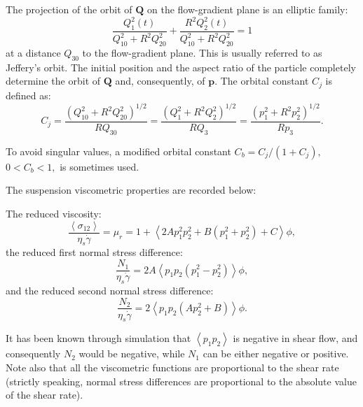 \documentclass[english,fleqn,allpages]{ISTE_science}[2018/07/30]
\begin{document}
The projection of the orbit of $\mathbf{Q}$ on the flow-gradient
plane is an elliptic family:
\begin{equation}
\frac{Q_{1}^{2}\left(t\right)}{Q_{10}^{2}+R^{2}Q_{20}^{2}}+\frac{R^{2}Q_{2}^{2}\left(t\right)}{Q_{10}^{2}+R^{2}Q_{20}^{2}}=1
\end{equation}
at a distance $Q_{30}$ to the flow-gradient plane. This is usually
referred to as Jeffery's orbit. The initial position and the aspect
ratio of the particle completely determine the orbit of $\mathbf{Q}$
and, consequently, of $\mathbf{p}.$ The orbital constant $C_{j}$
is defined as:
\begin{equation}
C_{j}=\frac{\left(Q_{10}^{2}+R^{2}Q_{20}^{2}\right)^{1/2}}{RQ_{30}}=\frac{\left(Q_{1}^{2}+R^{2}Q_{2}^{2}\right)^{1/2}}{RQ_{3}}=\frac{\left(p_{1}^{2}+R^{2}p_{2}^{2}\right)^{1/2}}{Rp_{3}}.
\end{equation}

To avoid singular values, a modified orbital constant $C_{b}=C_{j}/\left(1+C_{j}\right),$\break
$0<C_{b}<1,$ is sometimes used.


The suspension viscometric properties are recorded below:

The reduced viscosity: 
\begin{equation}
\frac{\left\langle \sigma_{12}\right\rangle }{\eta_{s}\dot{\gamma}}=\mu_{r}=1+\left\langle 2Ap_{1}^{2}p_{2}^{2}+B\left(p_{1}^{2}+p_{2}^{2}\right)+C\right\rangle \phi,
\end{equation}
the reduced first normal stress difference: 
\begin{equation}
\frac{N_{1}}{\eta_{s}\dot{\gamma}}=2A\left\langle p_{1}p_{2}\left(p_{1}^{2}-p_{2}^{2}\right)\right\rangle \phi,
\end{equation}
and the reduced second normal stress difference: 
\begin{equation}
\frac{N_{2}}{\eta_{s}\dot{\gamma}}=2\left\langle p_{1}p_{2}\left(Ap_{2}^{2}+B\right)\right\rangle \phi.
\end{equation}

It has been known through simulation that $\left\langle p_{1}p_{2}\right\rangle $
is negative in shear flow, and consequently $N_{2}$ would be negative,
while $N_{1}$ can be either negative or positive. Note also that
all the viscometric functions are proportional to the shear rate (strictly
speaking, normal stress differences are proportional to the absolute
value of the shear rate).
\end{document}
